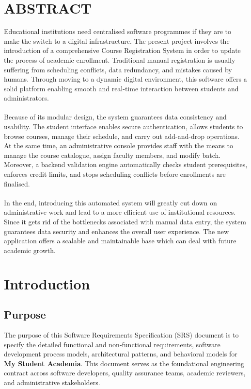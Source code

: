 \documentclass[a4paper,12pt]{article}
\begin{document}
\section*{ABSTRACT}
Educational institutions need centralised software programmes if they are to make the switch to a digital infrastructure. The present project involves the introduction of a comprehensive Course Registration System in order to update the process of academic enrollment. Traditional manual registration is usually suffering from scheduling conflicts, data redundancy, and mistakes caused by humans. Through moving to a dynamic digital environment, this software offers a solid platform enabling smooth and real-time interaction between students and administrators.
\\\\
Because of its modular design, the system guarantees data consistency and usability. The student interface enables secure authentication, allows students to browse courses, manage their schedule, and carry out add-and-drop operations. At the same time, an administrative console provides staff with the means to manage the course catalogue, assign faculty members, and modify batch. Moreover, a backend validation engine automatically checks student prerequisites, enforces credit limits, and stops scheduling conflicts before enrollments are finalised.
\\\\
In the end, introducing this automated system will greatly cut down on administrative work and lead to a more efficient use of institutional resources. Since it gets rid of the bottlenecks associated with manual data entry, the system guarantees data security and enhances the overall user experience. The new application offers a scalable and maintainable base which can deal with future academic growth.

\newpage
\tableofcontents
\newpage

\section{Introduction}

\subsection{Purpose}
The purpose of this Software Requirements Specification (SRS) document is to specify the detailed functional and non-functional requirements, software development process models, architectural patterns, and behavioral models for \textbf{My Student Academia}. This document serves as the foundational engineering contract across software developers, quality assurance teams, academic reviewers, and administrative stakeholders.
\end{document}
